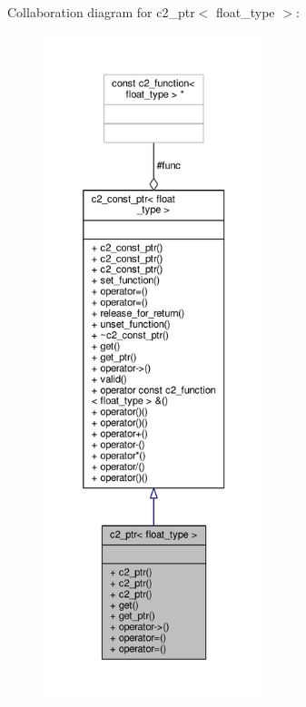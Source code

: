 Collaboration diagram for c2\+\_\+ptr$<$ float\+\_\+type $>$\+:
\nopagebreak
\begin{figure}[H]
\begin{center}
\leavevmode
\includegraphics[height=550pt]{classc2__ptr__coll__graph}
\end{center}
\end{figure}
